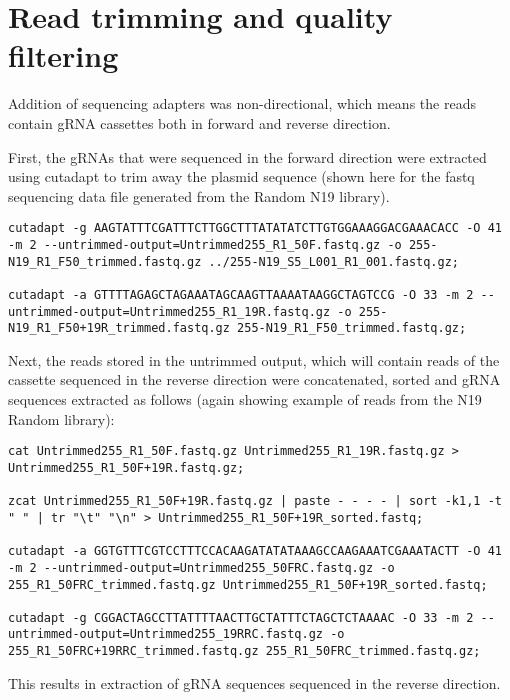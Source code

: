 \section{Read trimming and quality filtering}

Addition of sequencing adapters was non-directional, which means the reads contain gRNA cassettes both in forward and reverse direction.

First, the gRNAs that were sequenced in the forward direction were extracted using cutadapt \cite{Martin:2011va} to trim away the plasmid sequence (shown here for the fastq sequencing data file generated from the Random N19 library).

\begin{lstlisting}
cutadapt -g AAGTATTTCGATTTCTTGGCTTTATATATCTTGTGGAAAGGACGAAACACC -O 41 -m 2 --untrimmed-output=Untrimmed255_R1_50F.fastq.gz -o 255-N19_R1_F50_trimmed.fastq.gz ../255-N19_S5_L001_R1_001.fastq.gz;

cutadapt -a GTTTTAGAGCTAGAAATAGCAAGTTAAAATAAGGCTAGTCCG -O 33 -m 2 --untrimmed-output=Untrimmed255_R1_19R.fastq.gz -o 255-N19_R1_F50+19R_trimmed.fastq.gz 255-N19_R1_F50_trimmed.fastq.gz;
\end{lstlisting}

Next, the reads stored in the untrimmed output, which will contain reads of the cassette sequenced in the reverse direction were concatenated, sorted and gRNA sequences extracted as follows (again showing example of reads from the N19 Random library):

\begin{lstlisting}
cat Untrimmed255_R1_50F.fastq.gz Untrimmed255_R1_19R.fastq.gz > Untrimmed255_R1_50F+19R.fastq.gz;

zcat Untrimmed255_R1_50F+19R.fastq.gz | paste - - - - | sort -k1,1 -t " " | tr "\t" "\n" > Untrimmed255_R1_50F+19R_sorted.fastq;

cutadapt -a GGTGTTTCGTCCTTTCCACAAGATATATAAAGCCAAGAAATCGAAATACTT -O 41 -m 2 --untrimmed-output=Untrimmed255_50FRC.fastq.gz -o 255_R1_50FRC_trimmed.fastq.gz Untrimmed255_R1_50F+19R_sorted.fastq;

cutadapt -g CGGACTAGCCTTATTTTAACTTGCTATTTCTAGCTCTAAAAC -O 33 -m 2 --untrimmed-output=Untrimmed255_19RRC.fastq.gz -o 255_R1_50FRC+19RRC_trimmed.fastq.gz 255_R1_50FRC_trimmed.fastq.gz;
\end{lstlisting}

This results in extraction of gRNA sequences sequenced in the reverse direction.

